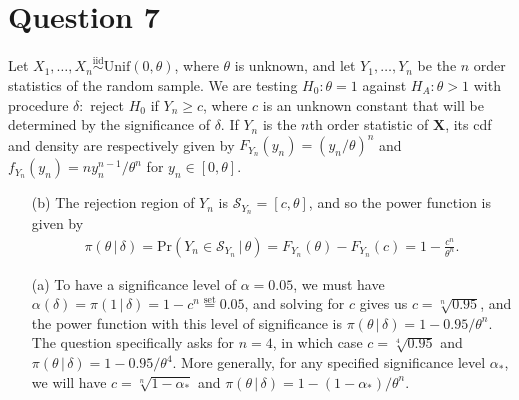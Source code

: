 \documentclass[10pt]{article}
\begin{document}
\section{Question 7} \noindent
Let \(X_1, \ldots, X_n \overset{\mathrm{iid}}{\sim} \mathrm{Unif}(0, \theta)\), where \(\theta\) is unknown, and let \(Y_1, \ldots, Y_n\) be the \(n\)
order statistics of the random sample. We are testing \(H_0 : \theta = 1\) against \(H_A : \theta > 1\) with procedure
\(\delta :\) reject \(H_0\) if \(Y_n \ge c\), where \(c\) is an unknown constant that will be determined by the significance of \(\delta\). 
If \(Y_n\) is the \(n\)th order statistic of \(\bm{X}\), its cdf and density are respectively given by \(F_{Y_n}(y_n) = (y_n / \theta)^n\)
and \(f_{Y_n}(y_n) = n y_n^{n-1} / \theta^n\) for \(y_n \in [0, \theta]\). 
\begin{itemize}
    \item[(b)] The rejection region of \(Y_n\) is \(\mathcal{S}_{Y_n} = [c, \theta]\), and so the power function is given by 
    \begin{align*}
        \pi(\theta \,|\, \delta)
        = \mathrm{Pr}(Y_n \in \mathcal{S}_{Y_n} \,|\, \theta)
        = F_{Y_n}(\theta) - F_{Y_n}(c)
        = 1 - \frac{c^n}{\theta^n}.
    \end{align*}
    \item[(a)] To have a significance level of \(\alpha = 0.05\), we must have \(\alpha(\delta) = \pi(1 \,|\, \delta) = 1 - c^n \overset{\mathrm{set}}{=} 0.05\), 
    and solving for \(c\) gives us \(c = \sqrt[n]{0.95}\), and the power function with this level of significance is 
    \(\pi(\theta \,|\, \delta) = 1 - 0.95 / \theta^n\). 
    The question specifically asks for \(n = 4\), in which case \(c = \sqrt[4]{0.95}\) and \(\pi(\theta \,|\, \delta) = 1 - 0.95 / \theta^4\).
    More generally, for any specified significance level \(\alpha_*\), we will have 
    \(c = \sqrt[n]{1 - \alpha_*}\) and \(\pi(\theta \,|\, \delta) = 1 - (1 - \alpha_*) / \theta^n\). 
\end{itemize}

\end{document}
